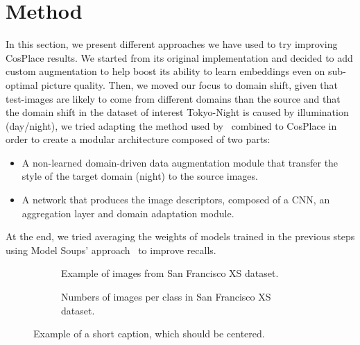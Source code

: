 \documentclass[10pt,twocolumn,letterpaper]{article}
\begin{document}
\section{Method}\label{sec:experiments}
In this section, we present different approaches we have used to try improving CosPlace results. We started from its original implementation and decided to add custom augmentation to help boost its ability to learn embeddings even on sub-optimal picture quality. Then, we moved our focus to domain shift, given that test-images are likely to come from different domains than the source and that the domain shift in the dataset of interest Tokyo-Night is caused by illumination (day/night), we tried adapting the method used by~\cite{adageo} combined to CosPlace in order to create a modular architecture composed of two parts:
\begin{itemize}
    \item A non-learned domain-driven data augmentation module that transfer the style of the target domain (night) to the source images.
    \item A network that produces the image descriptors, composed of a CNN, an aggregation layer and domain adaptation module.
\end{itemize}
At the end, we tried averaging the weights of models trained in the previous steps using Model Soups' approach~\cite{modelsoup} to improve recalls.

\begin{figure*}
  \centering
  \begin{subfigure}{0.58\linewidth}
    \fbox{\rule{0pt}{2in} \rule{.9\linewidth}{0pt}}
    \caption{Example of images from San Francisco XS dataset.}
    \label{fig:short-a}
  \end{subfigure}
  \hfill
  \begin{subfigure}{0.38\linewidth}
    \caption{Numbers of images per class in San Francisco XS dataset.}
    \label{fig:sfxs_density}
  \end{subfigure}
  \caption{Example of a short caption, which should be centered.}
  \label{fig:short}
\end{figure*}
\end{document}
